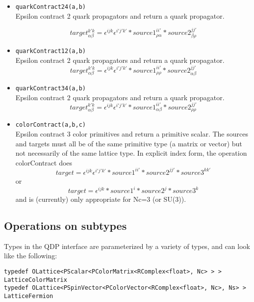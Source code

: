\documentclass[12pt,letterpaper]{article}
\begin{document}
\begin{itemize}
\item
\verb|quarkContract24(a,b)|\\
Epsilon contract 2 quark propagators and return a quark propagator.
   
$$target^{k' k}_{\alpha\beta} =
    \epsilon^{i j k}\epsilon^{i' j' k'}*source1^{i i'}_{\rho\alpha}*source2^{j j'}_{\beta\rho}$$

\item
\verb|quarkContract12(a,b)|\\
Epsilon contract 2 quark propagators and return a quark propagator.
$$target^{k' k}_{\alpha\beta} =
    \epsilon^{i j k}\epsilon^{i' j' k'}*source1^{i i'}_{\rho\rho}*source2^{j j'}_{\alpha\beta}$$

\item
\verb|quarkContract34(a,b)|\\
Epsilon contract 2 quark propagators and return a quark propagator.
$$target^{k' k}_{\alpha\beta} =
    \epsilon^{i j k}\epsilon^{i' j' k'}*source1^{i i'}_{\alpha\beta}*source2^{j j'}_{\rho\rho}$$

\item
\verb|colorContract(a,b,c)|\\
Epsilon contract 3 color primitives and return a primitive scalar.
The sources and targets must all be of the same primitive type (a matrix or vector)
but not necessarily of the same lattice type. In
explicit index form, the operation  colorContract does
$$
target =
  \epsilon^{i j k}\epsilon^{i' j' k'}* source1^{i i'}* source2^{j j'}*source3^{k k'}
$$
or
$$
target =
 \epsilon^{i j k}* source1^{i}* source2^{j}*source3^{k}
$$
and is (currently) only appropriate for Nc=3  (or SU(3)).

\end{itemize}


\bigskip

\subsection{Operations on subtypes}

Types in the QDP interface are parameterized by a variety of types, and
can look like the following:

\begin{small}
\begin{verbatim}
typedef OLattice<PScalar<PColorMatrix<RComplex<float>, Nc> > > LatticeColorMatrix
typedef OLattice<PSpinVector<PColorVector<RComplex<float>, Nc>, Ns> > LatticeFermion
\end{verbatim}
\end{small}
\end{document}
